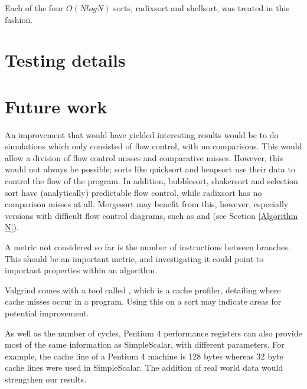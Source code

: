 Each of the four $O(NlogN)$ sorts, radixsort and shellsort, was treated in this fashion.

\section{Testing details}


\section{Future work}
An improvement that would have yielded interesting results would be to do simulations
which only consisted of flow control, with no comparisons. This would allow a
division of flow control misses and comparative misses. However, this would not
always be possible; sorts like quicksort and heapsort use their data to
control the flow of the program. In addition, bubblesort, shakersort and
selection sort have (analytically) predictable flow control, while radixsort has
no comparison misses at all. Mergesort may benefit from this, however, especially versions
with difficult flow control diagrams, such as  and  (see Section \ref{Algorithm N}).

A metric not considered so far is the number of instructions between branches.
This should be an important metric, and investigating it could point to
important properties within an algorithm.

Valgrind comes with a tool called , which is a cache
profiler, detailing where cache misses occur in a program. Using this on a
sort may indicate areas for potential improvement.

As well as the number of cycles, Pentium 4 performance registers can also provide
most of the same information as SimpleScalar, with different parameters. For
example, the cache line of a Pentium 4 machine is 128 bytes whereas 32 byte
cache lines were used in SimpleScalar. The addition of real world data would
strengthen our results.
